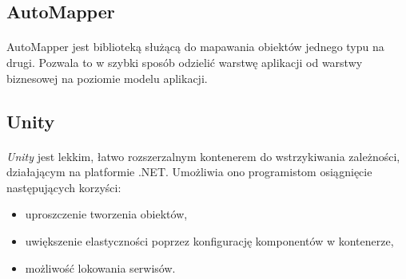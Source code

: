 \subsection{AutoMapper} %
\label{sub:automapper}
\paragraph{} %
\label{par:}

AutoMapper jest biblioteką służącą do mapawania obiektów jednego typu na drugi. Pozwala to w szybki sposób odzielić warstwę aplikacji od warstwy biznesowej na poziomie modelu aplikacji.

\subsection{Unity} %
\label{sub:unity}
\paragraph{} %
\label{par:paragraph_name}
\textit{Unity} jest lekkim, łatwo rozszerzalnym kontenerem do wstrzykiwania zależności, działającym na platformie .NET. Umożliwia ono programistom osiągnięcie następujących korzyści:
\begin{itemize}
\item uproszczenie tworzenia obiektów,
\item uwiększenie elastyczności poprzez konfigurację komponentów w kontenerze,
\item możliwość lokowania serwisów.
\end{itemize}
